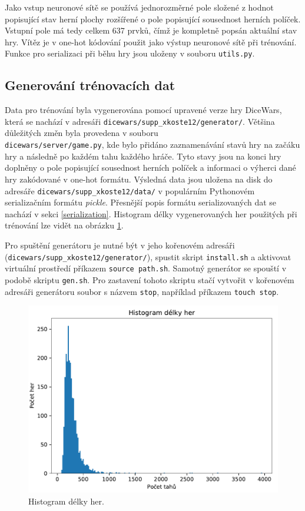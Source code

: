 \documentclass[a4paper,11pt]{article}
\begin{document}
		Jako vstup neuronové sítě se používá jednorozměrné pole složené z hodnot popisující stav herní plochy rozšířené o pole popisující sousednost herních políček. Vstupní pole má tedy celkem 637 prvků, čímž je kompletně popsán aktuální stav hry. Vítěz je v one-hot kódování použit jako výstup neuronové sítě při trénování. Funkce pro serializaci při běhu hry jsou uloženy v souboru \texttt{utils.py}.
	
		\subsection{Generování trénovacích dat}
		Data pro trénování byla vygenerována pomocí upravené verze hry DiceWars, která se nachází v adresáři \texttt{dicewars/supp\_xkoste12/generator/}. Většina důležitých změn byla provedena v souboru\\\texttt{dicewars/server/game.py}, kde bylo přidáno zaznamenávání stavů hry na začáku hry a následně po každém tahu každého hráče. Tyto stavy jsou na konci hry doplněny o pole popisující sousednost herních políček a informaci o výherci dané hry zakódované v one-hot formátu. Výsledná data jsou uložena na disk do adresáře \texttt{dicewars/supp\_xkoste12/data/} v populárním Pythonovém serializačním formátu \emph{pickle}. Přesnější popis formátu serializovaných dat se nachází v sekci \ref{serialization}. Histogram délky vygenerovaných her použitých při trénování lze vidět na obrázku \ref{fig:gamelen}.
		
		Pro spuštění generátoru je nutné být v jeho kořenovém adresáři\\(\texttt{dicewars/supp\_xkoste12/generator/}), spustit skript \texttt{install.sh} a aktivovat virtuální prostředí příkazem \texttt{source path.sh}. Samotný generátor se spouští v podobě skriptu \texttt{gen.sh}. Pro zastavení tohoto skriptu stačí vytvořit v kořenovém adresáři generátoru soubor s názvem \texttt{stop}, například příkazem \texttt{touch stop}.
		
		\begin{figure}[h]
			\centering
			\includegraphics[scale=0.7]{game_len_hist.pdf}
			\caption{Histogram délky her.}
			\label{fig:gamelen}
		\end{figure}
	
\end{document}
